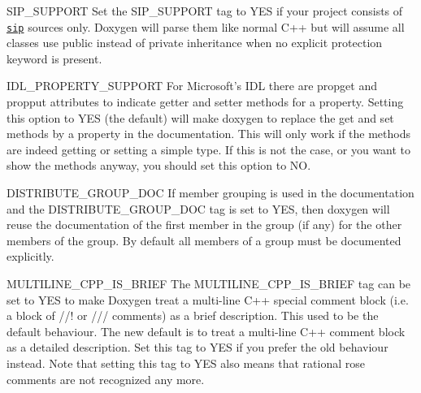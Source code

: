 \begin{DoxyDescription}
\label{config_cfg_sip_support}
\hypertarget{config_cfg_sip_support}{}
 
\item[{\ttfamily SIP\_\-SUPPORT} ] Set the SIP\_\-SUPPORT tag to YES if your project consists of \href{http://www.riverbankcomputing.co.uk/sip/}{\tt sip} sources only. Doxygen will parse them like normal C++ but will assume all classes use public instead of private inheritance when no explicit protection keyword is present.

\label{config_cfg_idl_property_support}
\hypertarget{config_cfg_idl_property_support}{}
 
\item[{\ttfamily IDL\_\-PROPERTY\_\-SUPPORT} ] For Microsoft's IDL there are propget and propput attributes to indicate getter and setter methods for a property. Setting this option to {\ttfamily YES} (the default) will make doxygen to replace the get and set methods by a property in the documentation. This will only work if the methods are indeed getting or setting a simple type. If this is not the case, or you want to show the methods anyway, you should set this option to {\ttfamily NO}.

\label{config_cfg_distribute_group_doc}
\hypertarget{config_cfg_distribute_group_doc}{}
 
\item[{\ttfamily DISTRIBUTE\_\-GROUP\_\-DOC} ] If member grouping is used in the documentation and the DISTRIBUTE\_\-GROUP\_\-DOC tag is set to YES, then doxygen will reuse the documentation of the first member in the group (if any) for the other members of the group. By default all members of a group must be documented explicitly.

\label{config_cfg_multiline_cpp_is_brief}
\hypertarget{config_cfg_multiline_cpp_is_brief}{}
 
\item[{\ttfamily MULTILINE\_\-CPP\_\-IS\_\-BRIEF} ] The MULTILINE\_\-CPP\_\-IS\_\-BRIEF tag can be set to YES to make Doxygen treat a multi-\/line C++ special comment block (i.e. a block of //! or /// comments) as a brief description. This used to be the default behaviour. The new default is to treat a multi-\/line C++ comment block as a detailed description. Set this tag to YES if you prefer the old behaviour instead. Note that setting this tag to YES also means that rational rose comments are not recognized any more.


\end{DoxyDescription}
